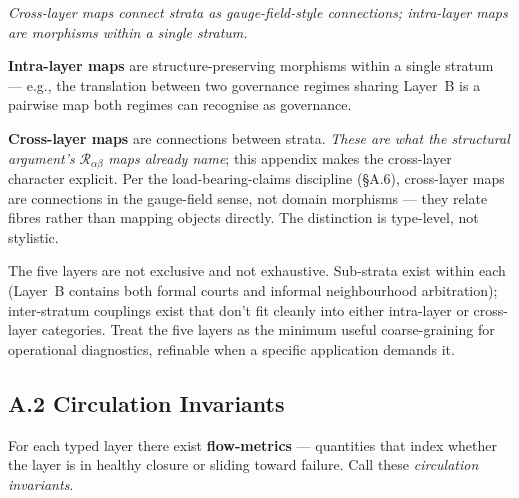 \documentclass[
]{article}
\begin{document}
\begin{center}

\smallskip
\textit{Cross-layer maps connect strata as gauge-field-style connections;
intra-layer maps are morphisms within a single stratum.}
\end{center}

\textbf{Intra-layer maps} are structure-preserving morphisms within a
single stratum --- e.g., the translation between two governance regimes
sharing Layer~B is a pairwise map both regimes can recognise as
governance.

\textbf{Cross-layer maps} are connections between strata. \emph{These
are what the structural argument's} \(\mathcal{R}_{\alpha\beta}\)
\emph{maps already name}; this appendix makes the cross-layer character
explicit. Per the load-bearing-claims discipline (\S A.6), cross-layer
maps are connections in the gauge-field sense, not domain morphisms ---
they relate fibres rather than mapping objects directly. The
distinction is type-level, not stylistic.

The five layers are not exclusive and not exhaustive. Sub-strata exist
within each (Layer~B contains both formal courts and informal
neighbourhood arbitration); inter-stratum couplings exist that don't
fit cleanly into either intra-layer or cross-layer categories. Treat
the five layers as the minimum useful coarse-graining for operational
diagnostics, refinable when a specific application demands it.

\subsection{A.2 Circulation
Invariants}\label{appendix-a-circulation-invariants}

For each typed layer there exist \textbf{flow-metrics} ---
quantities that index whether the layer is in healthy closure or
sliding toward failure. Call these \emph{circulation invariants}.
\end{document}
